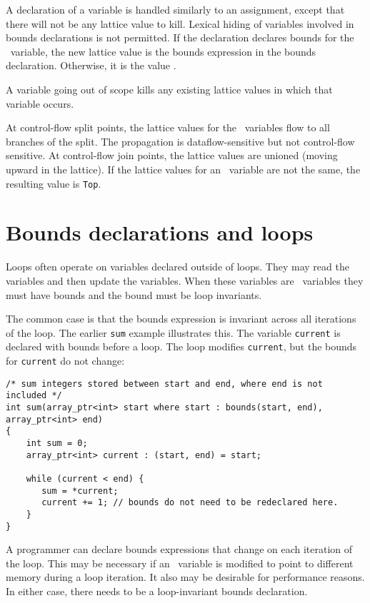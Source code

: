 A declaration of a variable is handled similarly to an assignment,
except that there will not be any lattice value to kill. Lexical hiding
of variables involved in bounds declarations is not permitted. If the
declaration declares bounds for the \arrayptr\ variable, the
new lattice value is the bounds expression in the bounds declaration.
Otherwise, it is the value \boundsunknown.

A variable going out of scope kills any existing lattice values in which
that variable occurs.

At control-flow split points, the lattice values for the
\arrayptr\ variables flow to all branches of the split. The
propagation is dataflow-sensitive but not control-flow sensitive. At
control-flow join points, the lattice values are unioned (moving upward
in the lattice). If the lattice values for an \arrayptr\
variable are not the same, the resulting value is \texttt{Top}.

\section{Bounds declarations and loops}

Loops often operate on variables declared outside of loops. They may
read the variables and then update the variables. When these variables
are \arrayptr\ variables they must have bounds and the bound
must be loop invariants.

The common case is that the bounds expression is invariant across all
iterations of the loop. The earlier \texttt{sum} example illustrates
this. The variable \texttt{current} is declared with bounds before a
loop. The loop modifies \texttt{current}, but the bounds for
\texttt{current} do not change:

\begin{lstlisting}
/* sum integers stored between start and end, where end is not included */
int sum(array_ptr<int> start where start : bounds(start, end), array_ptr<int> end)
{ 
    int sum = 0;
    array_ptr<int> current : (start, end) = start;

    while (current < end) {
       sum = *current;
       current += 1; // bounds do not need to be redeclared here.
    }
}
\end{lstlisting}

A programmer can declare bounds expressions that change on each
iteration of the loop. This may be necessary if an \arrayptr\
variable is modified to point to different memory during a loop
iteration. It also may be desirable for performance reasons. In either
case, there needs to be a loop-invariant bounds declaration.

